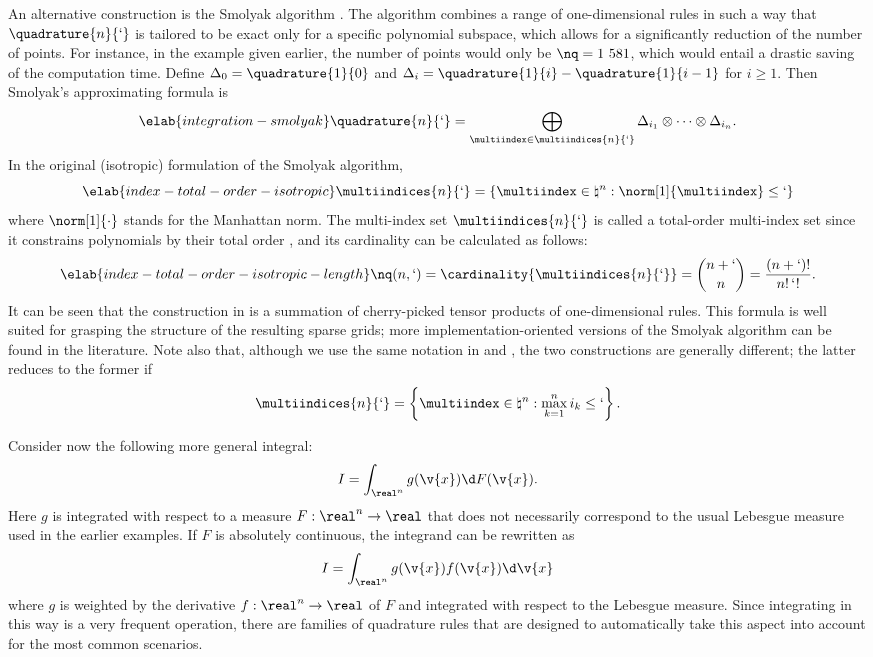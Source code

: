 An alternative construction is the Smolyak algorithm \cite{eldred2008,
heiss2008, maitre2010}. The algorithm combines a range of one-dimensional rules
in such a way that $\quadrature{n}{\lq}$ is tailored to be exact only for a
specific polynomial subspace, which allows for a significantly reduction of the
number of points. For instance, in the example given earlier, the number of
points would only be $\nq = 1~581$, which would entail a drastic saving of the
computation time. Define $\Delta_0 = \quadrature{1}{0}$ and $\Delta_i =
\quadrature{1}{i} - \quadrature{1}{i - 1}$ for $i \geq 1$. Then Smolyak's
approximating formula is
\begin{equation} \elab{integration-smolyak}
  \quadrature{n}{\lq} = \bigoplus_{\multiindex \in \multiindices{n}{\lq}} \Delta_{i_1} \otimes \cdots \otimes \Delta_{i_n}.
\end{equation}
In the original (isotropic) formulation of the Smolyak algorithm,
\begin{equation} \elab{index-total-order-isotropic}
  \multiindices{n}{\lq} = \left\{ \multiindex \in \natural^n: \norm[1]{\multiindex} \leq \lq \right\}
\end{equation}
where $\norm[1]{\cdot}$ stands for the Manhattan norm. The multi-index set
$\multiindices{n}{\lq}$ is called a total-order multi-index set since it
constrains polynomials by their total order \cite{eldred2008, beck2011}, and its
cardinality can be calculated as follows:
\begin{equation} \elab{index-total-order-isotropic-length}
  \nq(n, \lq) = \cardinality{\multiindices{n}{\lq}} = {n + \lq \choose n} = \frac{(n + \lq)!}{n! \, \lq!}.
\end{equation}
It can be seen that the construction in  is a
summation of cherry-picked tensor products of one-dimensional rules. This
formula is well suited for grasping the structure of the resulting sparse grids;
more implementation-oriented versions of the Smolyak algorithm can be found in
the literature. Note also that, although we use the same notation in
 and , the two constructions
are generally different; the latter reduces to the former if
\[
  \multiindices{n}{\lq} = \left\{ \multiindex \in \natural^n: \max_{k = 1}^n i_k \leq \lq \right\}.
\]

Consider now the following more general integral:
\[
  I = \int_{\real^n} g(\v{x}) \d F(\v{x}).
\]
Here $g$ is integrated with respect to a measure $F: \real^n \to \real$
\cite{durrett2010} that does not necessarily correspond to the usual Lebesgue
measure used in the earlier examples. If $F$ is absolutely continuous, the
integrand can be rewritten as
\[
  I = \int_{\real^n} g(\v{x}) f(\v{x}) \d \v{x}
\]
where $g$ is weighted by the derivative $f: \real^n \to \real$ of $F$ and
integrated with respect to the Lebesgue measure. Since integrating in this way
is a very frequent operation, there are families of quadrature rules that are
designed to automatically take this aspect into account for the most common
scenarios.

